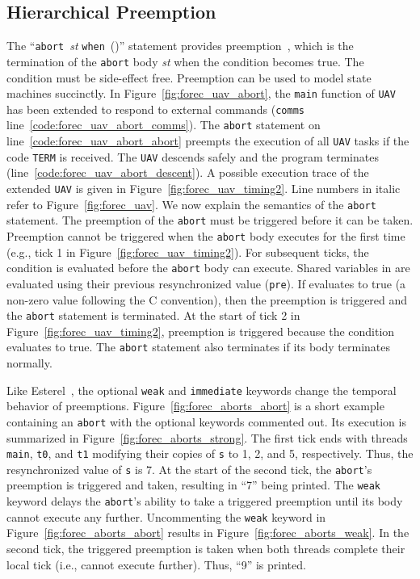 \subsection{Hierarchical Preemption}
The ``\verb$abort$~\emph{st} \verb$when$~(\expression{})''
statement provides preemption~\cite{timed_preemption}, which
is the termination of the \verb$abort$ body \emph{st} when
the condition \expression{} becomes true. The condition
\expression{} must be side-effect free. Preemption can be
used to model state machines succinctly. In Figure~\ref{fig:forec_uav_abort},
the \verb$main$ function of \verb$UAV$ has been extended to respond to 
external commands (\verb$comms$ line~\ref{code:forec_uav_abort_comms}). 
The \verb$abort$ statement 
on line~\ref{code:forec_uav_abort_abort} preempts the 
execution of all \verb$UAV$ tasks if the code \verb$TERM$ 
is received. The \verb$UAV$ descends safely and the program terminates 
(line~\ref{code:forec_uav_abort_descent}). 
A possible execution trace
of the extended \verb$UAV$ is given in Figure~\ref{fig:forec_uav_timing2}.
Line numbers in italic refer to Figure~\ref{fig:forec_uav}.
We now explain the semantics of the \verb$abort$ statement. 
The preemption of the \verb$abort$ must be triggered before it can be taken.
Preemption cannot be triggered when the \verb$abort$ body 
executes for the first time (e.g., tick 1 in Figure~\ref{fig:forec_uav_timing2}). 
For subsequent ticks, the
condition \expression{} is evaluated before the \verb$abort$
body can execute. Shared variables in \expression{} are
evaluated using their previous resynchronized value (\verb$pre$). If
\expression{} evaluates to true (a non-zero value following
the C convention), then the preemption is triggered and the
\verb$abort$ statement is terminated. At the start of tick 2
in Figure~\ref{fig:forec_uav_timing2}, preemption is triggered
because the condition evaluates to true. The \verb$abort$
statement also terminates if its body terminates normally. 

Like Esterel~\cite{timed_preemption}, the optional
\verb$weak$ and \verb$immediate$ keywords change the
temporal behavior of preemptions.
Figure~\ref{fig:forec_aborts_abort} is a short example containing
an \verb$abort$ with the optional keywords commented out.
Its execution is summarized in
Figure~\ref{fig:forec_aborts_strong}. The first tick ends with
threads \verb$main$, \verb$t0$, and \verb$t1$ modifying
their copies of \verb$s$ to 1, 2, and 5, respectively. Thus,
the resynchronized value of \verb$s$ is 7. At the start of
the second tick, the \verb$abort$'s preemption is triggered
and taken, resulting in ``7'' being printed. The \verb$weak$
keyword delays the \verb$abort$'s ability to take a triggered
preemption until its body cannot execute any further.
Uncommenting the \verb$weak$ keyword in Figure~\ref{fig:forec_aborts_abort} 
results in Figure~\ref{fig:forec_aborts_weak}. In the 
second tick, the triggered preemption is taken when
both threads complete their local tick (i.e., cannot execute
further). Thus, ``9'' is printed.

